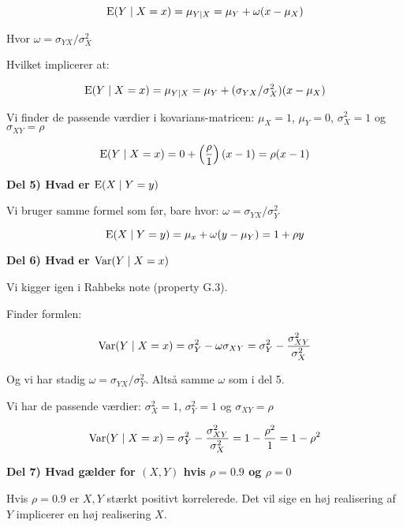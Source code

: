 \begin{equation}
    \text{E}(Y \mid X =x ) = \mu_{Y \mid X} = \mu_Y + \omega (x - \mu_X)
\end{equation}

Hvor $\omega = \sigma_{YX}/\sigma_X^2$

Hvilket implicerer at:

\begin{equation}
    \text{E}(Y \mid X =x ) = \mu_{Y \mid X} = \mu_Y + (\sigma_{YX}/\sigma_X^2)(x - \mu_X) 
\end{equation}

Vi finder de passende værdier i kovarians-matricen: $\mu_X = 1$, $\mu_Y = 0$, $\sigma_X^2=1$ og $\sigma_{XY} = \rho$

\begin{equation}
    \text{E}(Y \mid X = x) = 0 + \left(  \frac{\rho}{1}\right)(x - 1) = \rho(x -1)
\end{equation}

\textbf{Del 5) Hvad er $\text{E}(X \mid Y = y)$}

Vi bruger samme formel som før, bare hvor: $\omega = \sigma_{YX}/\sigma_Y^2$

\begin{equation}
    \text{E}(X \mid Y = y) = \mu_x + \omega(y - \mu_Y) = 1 + \rho y
\end{equation}

\textbf{Del 6) Hvad er $\text{Var}(Y\mid X= x)$}

Vi kigger igen i Rahbeks note (property G.3).

Finder formlen:

\begin{equation}
    \text{Var}(Y\mid X = x) = \sigma_Y^2 - \omega \sigma_{XY} = \sigma_Y^2 - \frac{\sigma_{XY}^2}{\sigma_X^2}
\end{equation}

Og vi har stadig $\omega = \sigma_{YX}/\sigma_Y^2$. Altså samme $\omega$ som i del 5.

Vi har de passende værdier:
$\sigma_X^2 = 1$, $\sigma_Y^2 =1$ og $\sigma_{XY} = \rho$

\begin{equation}
    \text{Var}(Y\mid X = x) = \sigma_Y^2 - \frac{\sigma_{XY}^2}{\sigma_X^2} = 1 - \frac{\rho^2}{1} = 1 -\rho^2
\end{equation}

\textbf{Del 7) Hvad gælder for $(X,Y)$ hvis $\rho = 0.9$ og $\rho=0$}

Hvis $\rho=0.9$ er $X,Y$ stærkt positivt korrelerede. Det vil sige en høj realisering af $Y$ implicerer en høj realisering $X$.

